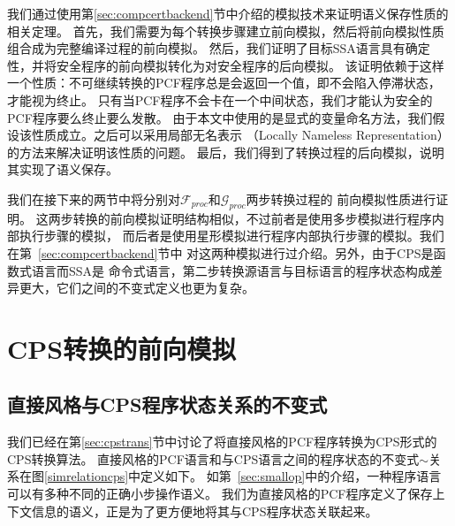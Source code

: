 我们通过使用第\ref{sec:compcertbackend}节中介绍的模拟技术来证明语义保存性质的相关定理。
首先，我们需要为每个转换步骤建立前向模拟，然后将前向模拟性质组合成为完整编译过程的前向模拟。
然后，我们证明了目标SSA语言具有确定性，并将安全程序的前向模拟转化为对安全程序的后向模拟。
该证明依赖于这样一个性质：不可继续转换的PCF程序总是会返回一个值，即不会陷入停滞状态，才能视为终止。
只有当PCF程序不会卡在一个中间状态，我们才能认为安全的PCF程序要么终止要么发散。
由于本文中使用的是显式的变量命名方法，我们假设该性质成立。之后可以采用局部无名表示
（Locally Nameless Representation）的方法来解决证明该性质的问题。
最后，我们得到了转换过程的后向模拟，说明其实现了语义保存。

我们在接下来的两节中将分别对$\mathcal{F}_{proc}$和$\mathcal{G}_{proc}$两步转换过程的
前向模拟性质进行证明。
这两步转换的前向模拟证明结构相似，不过前者是使用多步模拟进行程序内部执行步骤的模拟，
而后者是使用星形模拟进行程序内部执行步骤的模拟。我们在第~\ref{sec:compcertbackend}节中
对这两种模拟进行过介绍。另外，由于CPS是函数式语言而SSA是
命令式语言，第二步转换源语言与目标语言的程序状态构成差异更大，它们之间的不变式定义也更为复杂。

\section{CPS转换的前向模拟} \label{sec:cpsforward}

\subsection{直接风格与CPS程序状态关系的不变式}

我们已经在第\ref{sec:cpstrans}节中讨论了将直接风格的PCF程序转换为CPS形式的CPS转换算法。
直接风格的PCF语言和与CPS语言之间的程序状态的不变式$\sim$关系在图\ref{simrelationcps}中定义如下。
如第~\ref{sec:smallop}中的介绍，一种程序语言可以有多种不同的正确小步操作语义。
我们为直接风格的PCF程序定义了保存上下文信息的语义，正是为了更方便地将其与CPS程序状态关联起来。

